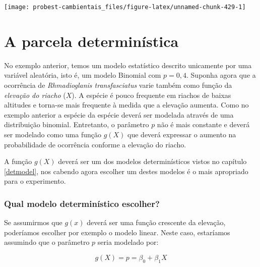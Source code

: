 \documentclass[
]{book}
\begin{document}
\begin{center}\texttt{[image: probest-cambientais\_files/figure-latex/unnamed-chunk-429-1]} \end{center}

\hypertarget{a-parcela-determinuxedstica}{%
\section{A parcela determinística}\label{a-parcela-determinuxedstica}}

No exemplo anterior, temos um modelo estatístico descrito unicamente por uma variável aleatória, isto é, um modelo Binomial com \(p = 0,4\). Suponha agora que a ocorrência de \emph{Rhmadioglanis transfasciatus} varie também como função da \emph{elevação do riacho} (\(X\)). A espécie é pouco frequente em riachos de baixas altitudes e torna-se mais frequente à medida que a elevação aumenta. Como no exemplo anterior a espécie da espécie deverá ser modelada através de uma distribuição binomial. Entretanto, o parâmetro \(p\) não é mais constante e deverá ser modelado como uma função \(g(X)\) que deverá expressar o aumento na probabilidade de ocorrência conforme a elevação do riacho.

A função \(g(X)\) deverá ser um dos modelos determinísticos vistos no capítulo \ref{detmodel}, nos cabendo agora escolher um destes modelos é o mais apropriado para o experimento.

\hypertarget{qual-modelo-determinuxedstico-escolher}{%
\subsubsection*{Qual modelo determinístico escolher?}\label{qual-modelo-determinuxedstico-escolher}}

Se assumirmos que \(g(x)\) deverá ser uma função crescente da elevação, poderíamos escolher por exemplo o modelo linear. Neste caso, estaríamos assumindo que o parâmetro \(p\) seria modelado por:

\[g(X) = p = \beta_0 + \beta_1 X\]
\end{document}
